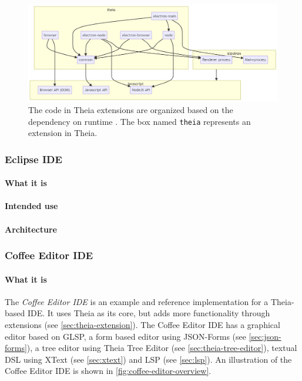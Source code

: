\begin{figure}[htbp]  %
  \centering
  \includegraphics[width=\textwidth]{figures/theia-code-organization}
  \caption[Theia code organization]{The code in Theia extensions are organized based on the dependency on runtime . The box named \texttt{theia} represents an extension in Theia.~\cite{antonkosyakovCodeOrganization2019}}\label{fig:theia-organization}
\end{figure}


\subsubsection{Eclipse IDE}\label{sec:eclipse-ide}

\paragraph*{What it is}

\paragraph*{Intended use}

\paragraph*{Architecture}


\subsubsection{Coffee Editor IDE}\label{sec:coffee-ide}

\paragraph*{What it is}
The \emph{Coffee Editor IDE} is an example and reference implementation for a \gls{Theia}-based \gls{IDE}.
It uses Theia as its core, but adds more functionality through extensions (see \cref{sec:theia-extension}).
The Coffee Editor IDE has a graphical editor based on \gls{GLSP}, a form based editor using JSON-Forms (see \cref{sec:json-forms}), a tree editor using Theia Tree Editor (see \cref{sec:theia-tree-editor}), textual \acrshort{DSL} using XText (see \cref{sec:xtext}) and \gls{LSP} (see \cref{sec:lsp}).
An illustration of the Coffee Editor IDE is shown in \cref{fig:coffee-editor-overview}.

